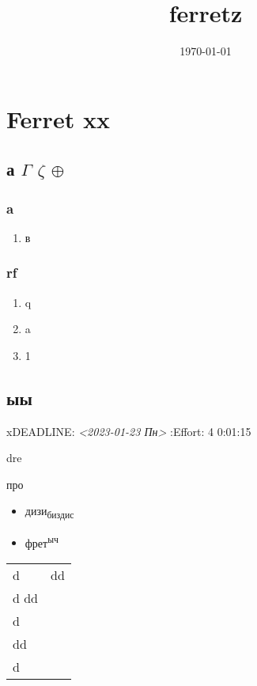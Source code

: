 \documentclass[11pt]{article}
\date{\today}
\title{ferretz}
\begin{document}
\maketitle
\tableofcontents


\section{Ferret \textbf{xx}}
\label{sec:orgbdef38a}
\subsection{а \(\Gamma\) \(\zeta\) \(\oplus\)}
\label{sec:orgf1eec45}
\subsubsection{a}
\label{sec:org269e66d}
\begin{enumerate}
\item в
\label{sec:org6ad6002}
\end{enumerate}
\subsubsection{rf}
\label{sec:orgd773277}
\begin{enumerate}
\item q
\label{sec:org893e5fd}
\item a
\label{sec:orgcfc2f85}
\item 1
\label{sec:orgaadcb7f}
\end{enumerate}
\subsection{ыы}
\label{sec:org5b0b7ec}
xDEADLINE: \textit{<2023-01-23 Пн>}
:Effort:   4
0:01:15
\begin{description}
\item[{0:02:07}] dre
\item[{0:02:33}] 

\item[{0:02:35}] 


\item про
\begin{itemize}
\item дизи\textsubscript{биздис}
\item фрет\textsuperscript{ыч}
\end{itemize}
\end{description}

\begin{center}
\begin{tabular}{ll}
d & dd\\
d dd & \\
d & \\
\hline
dd & \\
d & \\
\end{tabular}
\end{center}
\end{document}
